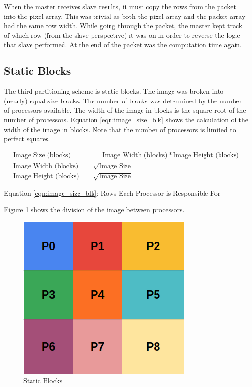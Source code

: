 \documentclass[11pt]{article}
\begin{document}
		When the master receives slave results, it must copy the rows from the packet into the pixel array. This was trivial as both the pixel array and the packet array had the same row width. While going through the packet, the master kept track of which row (from the slave perspective) it was on in order to reverse the logic that slave performed. At the end of the packet was the computation time again.
	
	\subsection{Static Blocks}
	
		The third partitioning scheme is static blocks. The image was broken into (nearly) equal size blocks. The number of blocks was determined by the number of processors available. The width of the image in blocks is the square root of the number of processors. Equation \ref{eqn:image_size_blk} shows the calculation of the width of the image in blocks. Note that the number of processors is limited to perfect squares.
		
		\begin{subequations}
		\begin{align}\label{eqn:image_size_blk}
			\text{Image Size (blocks)} & == \text{Image Width (blocks)} * \text{Image Height (blocks)}
			\\
			\text{Image Width (blocks)} & = \sqrt{\text{Image Size}}
			\\
			\text{Image Height (blocks)} & = \sqrt{\text{Image Size}}
		\end{align}
		\end{subequations}
		\begin{center}
			Equation \ref{eqn:image_size_blk}: Rows Each Processor is Responsible For
		\end{center}
	
		Figure \ref{fig:blocks} shows the division of the image between processors.
		
		\begin{figure}[H]
			\centering
			\includegraphics[width=0.7\linewidth]{Pictures/Blocks}
			\caption{Static Blocks}
			\label{fig:blocks}
		\end{figure}
	
\end{document}
